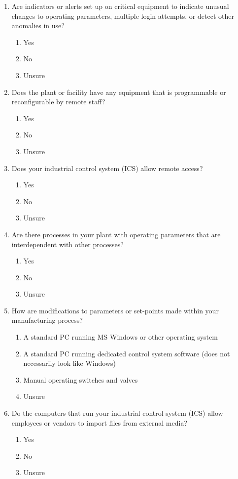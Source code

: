 \documentclass[./main.tex]{subfiles}
\begin{document}
\begin{enumerate}[label=\textbf{Q\arabic*.}]
\item Are indicators or alerts set up on critical equipment to indicate unusual changes to operating parameters, multiple login attempts, or detect other anomalies in use?
\begin{enumerate}
    \item Yes
    \item No
    \item Unsure
\end{enumerate}

\item Does the plant or facility have any equipment that is programmable or reconfigurable by remote staff?
\begin{enumerate}
    \item Yes
    \item No
    \item Unsure
\end{enumerate}

\item Does your industrial control system (ICS) allow remote access?
\begin{enumerate}
    \item Yes
    \item No
    \item Unsure
\end{enumerate}

\item Are there processes in your plant with operating parameters that are interdependent with other processes?
\begin{enumerate}
    \item Yes
    \item No
    \item Unsure
\end{enumerate}

\clearpage

\item How are modifications to parameters or set-points made within your manufacturing process?
\begin{enumerate}
    \item A standard PC running MS Windows or other operating system
    \item A standard PC running dedicated control system software (does not necessarily look like Windows)
    \item Manual operating switches and valves
    \item Unsure
\end{enumerate}

\item Do the computers that run your industrial control system (ICS) allow employees or vendors to import files from external media?
\begin{enumerate}
    \item Yes
    \item No
    \item Unsure
\end{enumerate}

\end{enumerate}
\end{document}
